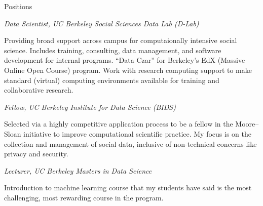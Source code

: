 \begin{rubric}{Positions}

\entry*[2013--present] \emph{Data Scientist, UC Berkeley Social Sciences Data
    Lab (D-Lab)}
\par Providing broad support across campus for computaionally intensive social
science. Includes training, consulting, data management, and software
development for internal programs. “Data Czar” for Berkeley's EdX (Massive
Online Open Course) program. Work with research computing support to make
standard (virtual) computing environments available for training and
collaborative research.

\entry*[2014--present] \emph{Fellow, UC Berkeley Institute for Data Science
    (BIDS)}
\par Selected via a highly competitive application process to be a fellow in the
Moore--Sloan initiative to improve computational scientific practice. My focus
is on the collection and management of social data, inclusive of non-technical
concerns like privacy and security.

\entry*[2014] \emph{Lecturer, UC Berkeley Masters in Data Science}
\par Introduction to machine learning course that my students have said is the
most challenging, most rewarding course in the program.

\end{rubric}
